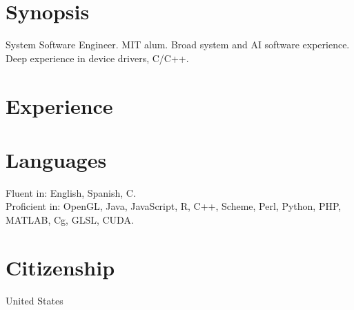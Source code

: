 \documentclass[line,margin]{res}
\begin{document}
\thispagestyle{empty}

\address{1201 West Park Street, Cedar Park, TX 78613-2801}
\address{ \href{mailto:jsoltren@alum.mit.edu}{jsoltren@alum.mit.edu}
   +1 (347) 503-9558
   \url{https://www.linkedin.com/in/jsoltren}}

\begin{resume}

\section{Synopsis}
System Software Engineer. MIT alum. Broad system and AI software experience. \\
Deep experience in device drivers, C/C++.



\section{Experience}





%
%



%







\section{Languages}
Fluent in: English, Spanish, C.\\
Proficient in: OpenGL, Java, JavaScript, R, C++, Scheme, Perl, Python, PHP,\\
\mbox{MATLAB}, Cg, GLSL, CUDA.

\section{Citizenship}
United States

\end{resume}
\end{document}
